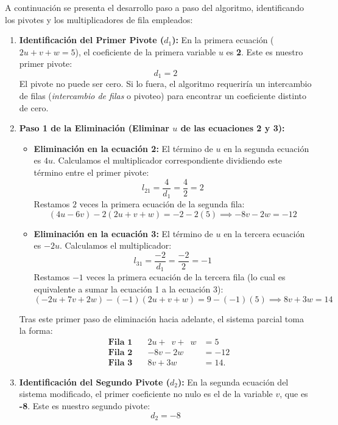 \documentclass[11pt, a4paper]{article}
\begin{document}
A continuación se presenta el desarrollo paso a paso del algoritmo, identificando los pivotes y los multiplicadores de fila empleados:

\begin{enumerate}
    \item \textbf{Identificación del Primer Pivote ($d_1$):}
    En la primera ecuación ($2u + v + w = 5$), el coeficiente de la primera variable $u$ es \textbf{2}. Este es nuestro primer pivote:
    $$d_1 = 2$$
    El pivote no puede ser cero. Si lo fuera, el algoritmo requeriría un intercambio de filas (\textit{intercambio de filas} o pivoteo) para encontrar un coeficiente distinto de cero.

    \item \textbf{Paso 1 de la Eliminación (Eliminar $u$ de las ecuaciones 2 y 3):}
    \begin{itemize}
        \item \textbf{Eliminación en la ecuación 2:} El término de $u$ en la segunda ecuación es $4u$. Calculamos el multiplicador correspondiente dividiendo este término entre el primer pivote:
        $$l_{21} = \frac{4}{d_1} = \frac{4}{2} = 2$$
        Restamos $2$ veces la primera ecuación de la segunda fila:
        $$(4u - 6v) - 2(2u + v + w) = -2 - 2(5) \implies -8v - 2w = -12$$
        
        \item \textbf{Eliminación en la ecuación 3:} El término de $u$ en la tercera ecuación es $-2u$. Calculamos el multiplicador:
        $$l_{31} = \frac{-2}{d_1} = \frac{-2}{2} = -1$$
        Restamos $-1$ veces la primera ecuación de la tercera fila (lo cual es equivalente a sumar la ecuación 1 a la ecuación 3):
        $$(-2u + 7v + 2w) - (-1)(2u + v + w) = 9 - (-1)(5) \implies 8v + 3w = 14$$
    \end{itemize}
    Tras este primer paso de eliminación hacia adelante, el sistema parcial toma la forma:
\begin{equation}
\begin{aligned}
  &\textbf{Fila 1} \quad & 2u + \phantom{0}v + \phantom{0}w &= 5 \\
  &\textbf{Fila 2} \quad & -8v - 2w &= -12 \\
  &\textbf{Fila 3} \quad & 8v + 3w &= 14.
\end{aligned}
\end{equation}

    \item \textbf{Identificación del Segundo Pivote ($d_2$):}
    En la segunda ecuación del sistema modificado, el primer coeficiente no nulo es el de la variable $v$, que es \textbf{-8}. Este es nuestro segundo pivote:
    $$d_2 = -8$$


\end{enumerate}
\end{document}
